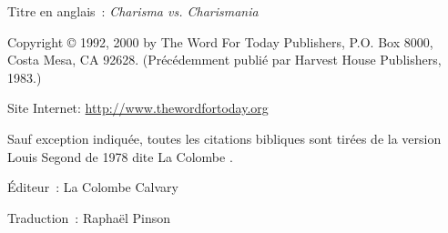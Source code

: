 \newpage
\mbox{}
\vfill
\noindent Titre en anglais~: \emph{Charisma vs. Charismania}

\noindent Copyright \copyright{} 1992, 2000 by The Word For Today Publishers, P.O. Box 8000, \\
Costa Mesa, CA 92628. (Précédemment publié par Harvest House Publishers, 1983.) \\


\noindent Site Internet: \url{http://www.thewordfortoday.org}

\noindent Sauf exception indiquée, toutes les citations bibliques sont
 tirées de la version Louis Segond de 1978 dite \og La Colombe \fg{}.

\noindent Éditeur~: La Colombe Calvary

\noindent Traduction~: Raphaël Pinson

